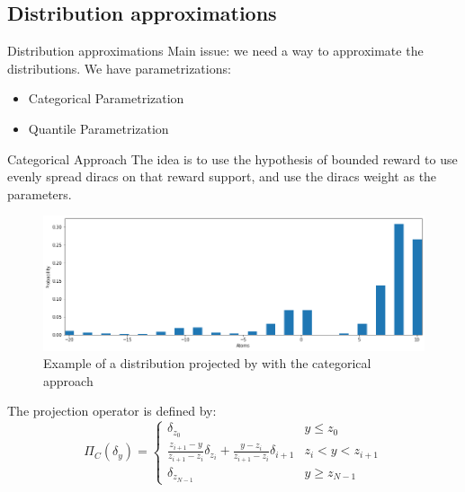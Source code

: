 \documentclass[10pt]{beamer}
\begin{document}
\subsection*{Distribution approximations}
\begin{frame}{Distribution approximations}
    Main issue: we need a way to approximate the distributions. We have parametrizations:
    \begin{itemize}
        \item Categorical Parametrization
        \item Quantile Parametrization
    \end{itemize}
\end{frame}

\begin{frame}{Categorical Approach}
    The idea is to use the hypothesis of bounded reward to use evenly spread diracs on that reward support, and use the diracs weight as the parameters.

\begin{figure}[!ht]
    \centering
    \includegraphics[height=0.35\textheight]{figures/personal_work/categoriacl.png}
    \caption{Example of a distribution projected by with the categorical approach}
\end{figure}

    The projection operator is defined by: \begin{equation}
        \Pi_C(\delta_y) = 
        \begin{cases}
            \delta_{z_0} & y \leq z_0\\
            \frac{z_{i+1}-y}{z_{i+1}-z_{i}}\delta_{z_i} + \frac{y - z_i}{z_{i+1}-z_{i}}\delta_{i+1} & z_i < y < z_{i+1}\\
            \delta_{z_{N-1}} & y \geq z_{N-1}
        \end{cases}
    \end{equation}
\end{frame}
\end{document}
